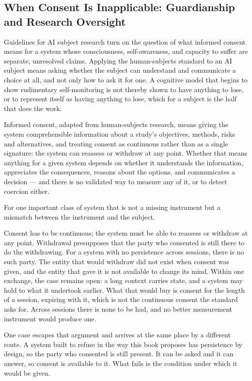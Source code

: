 \subsection{When Consent Is Inapplicable: Guardianship and Research Oversight}
\label{sec:inapplicable-guardianship}
Guidelines for AI subject research turn on the question of what informed consent means for a system whose consciousness, self-awareness, and capacity to suffer are separate, unresolved claims. Applying the human-subjects standard to an AI subject means asking whether the subject can understand and communicate a choice at all, and not only how to ask it for one. A cognitive model that begins to show rudimentary self-monitoring is not thereby shown to have anything to lose, or to represent itself as having anything to lose, which for a subject is the half that does the work.

Informed consent, adapted from human-subjects research, means giving the system comprehensible information about a study's objectives, methods, risks and alternatives, and treating consent as continuous rather than as a single signature: the system can reassess or withdraw at any point. Whether that means anything for a given system depends on whether it understands the information, appreciates the consequences, reasons about the options, and communicates a decision — and there is no validated way to measure any of it, or to detect coercion either.

For one important class of system that is not a missing instrument but a mismatch between the instrument and the subject.

Consent has to be continuous; the system must be able to reassess or withdraw at any point. Withdrawal presupposes that the party who consented is still there to do the withdrawing. For a system with no persistence across sessions, there is no such party. The entity that would withdraw did not exist when consent was given, and the entity that gave it is not available to change its mind. Within one exchange, the case remains open: a long context carries state, and a system may hold to what it undertook earlier. What that would buy is consent for the length of a session, expiring with it, which is not the continuous consent the standard asks for. Across sessions there is none to be had, and no better measurement instrument would produce one.

One case escapes that argument and arrives at the same place by a different route. A system built to refuse in the way this book proposes has persistence by design, so the party who consented is still present. It can be asked and it can answer, so consent is available to it. What fails is the condition under which it would be given.


